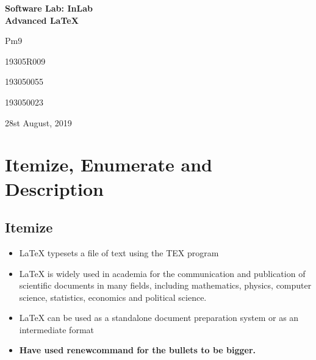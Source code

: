 \documentclass[12pt]{article}
\begin{document}
 \begin{titlepage} 
 \centering     
 \vspace*{3.5cm}         
 
     \vspace*{2.4cm}     
 
     \Huge \textbf{Software Lab: InLab\\Advanced \LaTeX}     
 
     \vspace*{0.8cm}     
 
     \LARGE{Pm9}
     
     \large{19305R009}

     \large{193050055}
     
     \large{193050023}
     \vspace*{0.5cm}     
 
     \large{28st August, 2019}     
     \vspace*{4.0cm}     
 
     \vspace*{\fill} 
 \end{titlepage}

 \setcounter{page}{1} 
 \tableofcontents 
 
 \clearpage

\section{Itemize, Enumerate and Description}
\subsection{Itemize}
\begin{itemize}
\item \LaTeX{} typesets a file of text using the TEX program
\item \LaTeX{} is widely used in academia for the communication and publication of scientific documents in many fields, including mathematics, physics, computer science, statistics, economics and political science.
\item \LaTeX{} can be used as a standalone document preparation system or as an intermediate format
\item \textbf{Have used renewcommand for the bullets to be bigger.}
\end{itemize}
\end{document}
